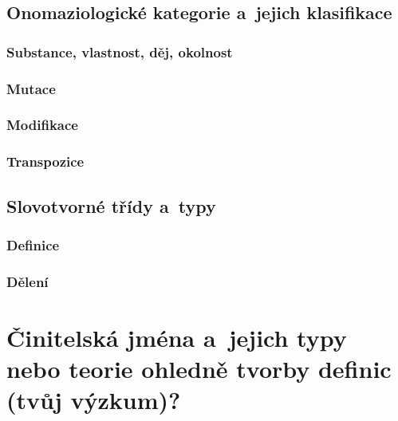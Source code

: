 \hypertarget{onomaziologickuxe9-kategorie-a-jejich-klasifikace}{%
\section{Onomaziologické kategorie a~jejich
klasifikace}\label{onomaziologickuxe9-kategorie-a-jejich-klasifikace}}

\hypertarget{substance-vlastnost-dux11bj-okolnost}{%
\subsection{Substance, vlastnost, děj,
okolnost}\label{substance-vlastnost-dux11bj-okolnost}}

\hypertarget{mutace}{%
\subsection{Mutace}\label{mutace}}

\hypertarget{modifikace}{%
\subsection{Modifikace}\label{modifikace}}

\hypertarget{transpozice}{%
\subsection{Transpozice}\label{transpozice}}

\hypertarget{slovotvornuxe9-tux159uxeddy-a-typy}{%
\section{Slovotvorné třídy
a~typy}\label{slovotvornuxe9-tux159uxeddy-a-typy}}

\hypertarget{definice}{%
\subsection{Definice}\label{definice}}

\hypertarget{dux11blenuxed}{%
\subsection{Dělení}\label{dux11blenuxed}}

\hypertarget{ux10dinitelskuxe1-jmuxe9na-a-jejich-typy-nebo-teorie-ohlednux11b-tvorby-definic-tvux16fj-vuxfdzkum}{%
\chapter{Činitelská jména a~jejich typy nebo teorie ohledně tvorby
definic (tvůj
výzkum)?}\label{ux10dinitelskuxe1-jmuxe9na-a-jejich-typy-nebo-teorie-ohlednux11b-tvorby-definic-tvux16fj-vuxfdzkum}}

